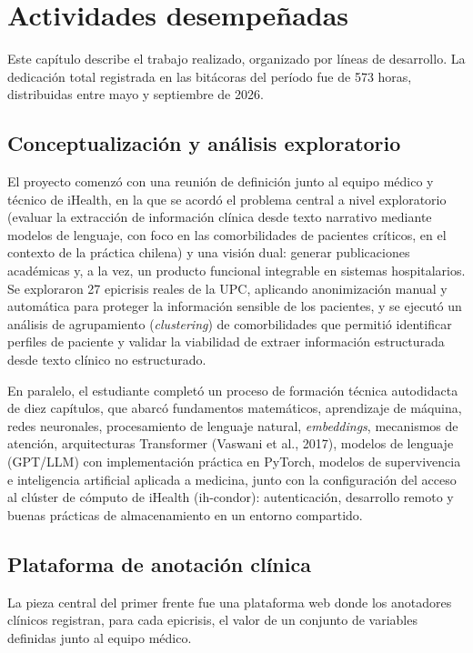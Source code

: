 \documentclass[12pt,letterpaper]{article}
\begin{document}
\section{Actividades desempeñadas}

Este capítulo describe el trabajo realizado, organizado por líneas de desarrollo. La dedicación total registrada en las bitácoras del período fue de 573 horas, distribuidas entre mayo y septiembre de 2026.

\subsection{Conceptualización y análisis exploratorio}

El proyecto comenzó con una reunión de definición junto al equipo médico y técnico de iHealth, en la que se acordó el problema central a nivel exploratorio (evaluar la extracción de información clínica desde texto narrativo mediante modelos de lenguaje, con foco en las comorbilidades de pacientes críticos, en el contexto de la práctica chilena) y una visión dual: generar publicaciones académicas y, a la vez, un producto funcional integrable en sistemas hospitalarios. Se exploraron 27 epicrisis reales de la UPC, aplicando anonimización manual y automática para proteger la información sensible de los pacientes, y se ejecutó un análisis de agrupamiento (\textit{clustering}) de comorbilidades que permitió identificar perfiles de paciente y validar la viabilidad de extraer información estructurada desde texto clínico no estructurado.

En paralelo, el estudiante completó un proceso de formación técnica autodidacta de diez capítulos, que abarcó fundamentos matemáticos, aprendizaje de máquina, redes neuronales, procesamiento de lenguaje natural, \textit{embeddings}, mecanismos de atención, arquitecturas Transformer (Vaswani et al., 2017), modelos de lenguaje (GPT/LLM) con implementación práctica en PyTorch, modelos de supervivencia e inteligencia artificial aplicada a medicina, junto con la configuración del acceso al clúster de cómputo de iHealth (ih-condor): autenticación, desarrollo remoto y buenas prácticas de almacenamiento en un entorno compartido.

\subsection{Plataforma de anotación clínica}

La pieza central del primer frente fue una plataforma web donde los anotadores clínicos registran, para cada epicrisis, el valor de un conjunto de variables definidas junto al equipo médico.
\end{document}
